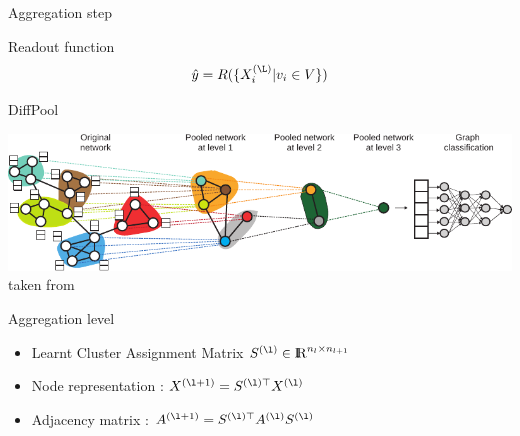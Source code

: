 \documentclass[11pt]{beamer}
\begin{document}
\begin{frame}{Aggregation step}
  \begin{block}{Readout function}
    $$
    \hat{y} = R(\{X_i^{(\L)} |  v_i \in V \})
    $$
  \end{block}
  
\end{frame}


\begin{frame}{DiffPool}
  \begin{center}
    \includegraphics[width=\textwidth]{diffpool} \flushright \tiny{taken
      from \cite{Ying2018}}
  \end{center}

  \begin{block}{Aggregation level}
{\small     \begin{itemize}
    \item Learnt Cluster Assignment Matrix $S^{(\l)} \in \dbR^{n_l \times n_{l+1}}$
    \item Node representation : $X^{(\l+1)} = S^{(\l)\top} X^{(\l)}$
    \item Adjacency matrix : $A^{(\l+1)} = S^{(\l) \top} A^{(\l)} S^{(\l)}$
    \end{itemize}
}    
  \end{block}

\end{frame} 
\end{document}
